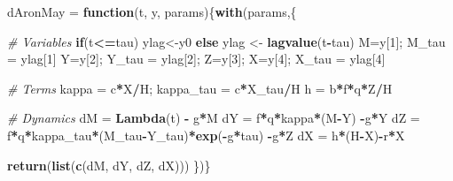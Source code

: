 \documentclass[
]{book}
\newenvironment{Shaded}{\begin{snugshade}}{\end{snugshade}}
\newcommand{\CommentTok}[1]{\textcolor[rgb]{0.56,0.35,0.01}{\textit{#1}}}
\newcommand{\ControlFlowTok}[1]{\textcolor[rgb]{0.13,0.29,0.53}{\textbf{#1}}}
\newcommand{\DecValTok}[1]{\textcolor[rgb]{0.00,0.00,0.81}{#1}}
\newcommand{\FunctionTok}[1]{\textcolor[rgb]{0.13,0.29,0.53}{\textbf{#1}}}
\newcommand{\NormalTok}[1]{#1}
\newcommand{\OtherTok}[1]{\textcolor[rgb]{0.56,0.35,0.01}{#1}}
\newcommand{\SpecialCharTok}[1]{\textcolor[rgb]{0.81,0.36,0.00}{\textbf{#1}}}
\begin{document}
\begin{Shaded}
\begin{Highlighting}[]
\NormalTok{dAronMay }\OtherTok{=} \ControlFlowTok{function}\NormalTok{(t, y, params)\{}\FunctionTok{with}\NormalTok{(params,\{}
 
  \CommentTok{\# Variables  }
  \ControlFlowTok{if}\NormalTok{(t}\SpecialCharTok{\textless{}=}\NormalTok{tau) ylag}\OtherTok{\textless{}{-}}\NormalTok{y0 }\ControlFlowTok{else}\NormalTok{ ylag }\OtherTok{\textless{}{-}} \FunctionTok{lagvalue}\NormalTok{(t}\SpecialCharTok{{-}}\NormalTok{tau)}
\NormalTok{  M}\OtherTok{=}\NormalTok{y[}\DecValTok{1}\NormalTok{]; M\_tau }\OtherTok{=}\NormalTok{ ylag[}\DecValTok{1}\NormalTok{]}
\NormalTok{  Y}\OtherTok{=}\NormalTok{y[}\DecValTok{2}\NormalTok{]; Y\_tau }\OtherTok{=}\NormalTok{ ylag[}\DecValTok{2}\NormalTok{]; }
\NormalTok{  Z}\OtherTok{=}\NormalTok{y[}\DecValTok{3}\NormalTok{]; }
\NormalTok{  X}\OtherTok{=}\NormalTok{y[}\DecValTok{4}\NormalTok{]; X\_tau }\OtherTok{=}\NormalTok{ ylag[}\DecValTok{4}\NormalTok{]}
   
  \CommentTok{\# Terms }
\NormalTok{  kappa }\OtherTok{=}\NormalTok{ c}\SpecialCharTok{*}\NormalTok{X}\SpecialCharTok{/}\NormalTok{H; kappa\_tau }\OtherTok{=}\NormalTok{ c}\SpecialCharTok{*}\NormalTok{X\_tau}\SpecialCharTok{/}\NormalTok{H}
\NormalTok{  h }\OtherTok{=}\NormalTok{ b}\SpecialCharTok{*}\NormalTok{f}\SpecialCharTok{*}\NormalTok{q}\SpecialCharTok{*}\NormalTok{Z}\SpecialCharTok{/}\NormalTok{H }
   
  \CommentTok{\# Dynamics }
\NormalTok{  dM }\OtherTok{=} \FunctionTok{Lambda}\NormalTok{(t) }\SpecialCharTok{{-}}\NormalTok{ g}\SpecialCharTok{*}\NormalTok{M}
\NormalTok{  dY }\OtherTok{=}\NormalTok{ f}\SpecialCharTok{*}\NormalTok{q}\SpecialCharTok{*}\NormalTok{kappa}\SpecialCharTok{*}\NormalTok{(M}\SpecialCharTok{{-}}\NormalTok{Y) }\SpecialCharTok{{-}}\NormalTok{g}\SpecialCharTok{*}\NormalTok{Y}
\NormalTok{  dZ }\OtherTok{=}\NormalTok{ f}\SpecialCharTok{*}\NormalTok{q}\SpecialCharTok{*}\NormalTok{kappa\_tau}\SpecialCharTok{*}\NormalTok{(M\_tau}\SpecialCharTok{{-}}\NormalTok{Y\_tau)}\SpecialCharTok{*}\FunctionTok{exp}\NormalTok{(}\SpecialCharTok{{-}}\NormalTok{g}\SpecialCharTok{*}\NormalTok{tau) }\SpecialCharTok{{-}}\NormalTok{g}\SpecialCharTok{*}\NormalTok{Z}
\NormalTok{  dX }\OtherTok{=}\NormalTok{ h}\SpecialCharTok{*}\NormalTok{(H}\SpecialCharTok{{-}}\NormalTok{X)}\SpecialCharTok{{-}}\NormalTok{r}\SpecialCharTok{*}\NormalTok{X}
  
  \FunctionTok{return}\NormalTok{(}\FunctionTok{list}\NormalTok{(}\FunctionTok{c}\NormalTok{(dM, dY, dZ, dX)))}
\NormalTok{\})\} }
\end{Highlighting}
\end{Shaded}
\end{document}
